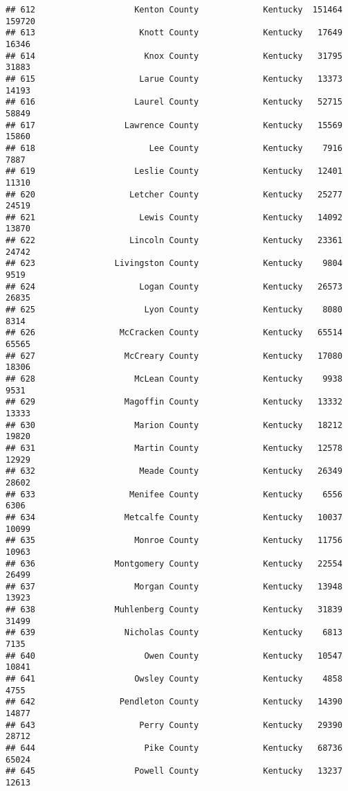 \documentclass[
]{article}
\begin{document}
\begin{verbatim}
## 612                    Kenton County             Kentucky  151464  159720
## 613                     Knott County             Kentucky   17649   16346
## 614                      Knox County             Kentucky   31795   31883
## 615                     Larue County             Kentucky   13373   14193
## 616                    Laurel County             Kentucky   52715   58849
## 617                  Lawrence County             Kentucky   15569   15860
## 618                       Lee County             Kentucky    7916    7887
## 619                    Leslie County             Kentucky   12401   11310
## 620                   Letcher County             Kentucky   25277   24519
## 621                     Lewis County             Kentucky   14092   13870
## 622                   Lincoln County             Kentucky   23361   24742
## 623                Livingston County             Kentucky    9804    9519
## 624                     Logan County             Kentucky   26573   26835
## 625                      Lyon County             Kentucky    8080    8314
## 626                 McCracken County             Kentucky   65514   65565
## 627                  McCreary County             Kentucky   17080   18306
## 628                    McLean County             Kentucky    9938    9531
## 629                  Magoffin County             Kentucky   13332   13333
## 630                    Marion County             Kentucky   18212   19820
## 631                    Martin County             Kentucky   12578   12929
## 632                     Meade County             Kentucky   26349   28602
## 633                   Menifee County             Kentucky    6556    6306
## 634                  Metcalfe County             Kentucky   10037   10099
## 635                    Monroe County             Kentucky   11756   10963
## 636                Montgomery County             Kentucky   22554   26499
## 637                    Morgan County             Kentucky   13948   13923
## 638                Muhlenberg County             Kentucky   31839   31499
## 639                  Nicholas County             Kentucky    6813    7135
## 640                      Owen County             Kentucky   10547   10841
## 641                    Owsley County             Kentucky    4858    4755
## 642                 Pendleton County             Kentucky   14390   14877
## 643                     Perry County             Kentucky   29390   28712
## 644                      Pike County             Kentucky   68736   65024
## 645                    Powell County             Kentucky   13237   12613

\end{verbatim}
\end{document}
